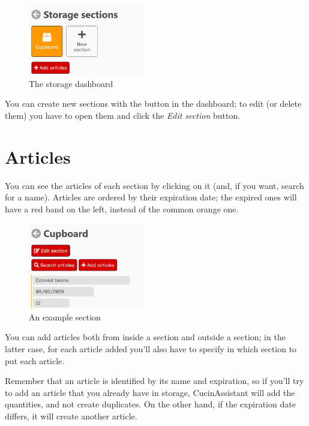 \documentclass[12pt, a4paper]{report}
\begin{document}
    \begin{figure}[H]
        \centering
        \includegraphics[width=0.45\textwidth]{assets/en/sections.png}
        \caption{The storage dashboard}
    \end{figure}

    You can create new sections with the button in the dashboard; to edit (or delete them) you have to open them and click the 
    \emph{Edit section} button.

    \section{Articles}

    You can see the articles of each section by clicking on it (and, if you want, search for a name).
    Articles are ordered by their expiration date; the expired ones will have a red band on the left, instead of the common orange one.

    \begin{figure}[H]
        \centering
        \includegraphics[width=0.45\textwidth]{assets/en/articles.png}
        \caption{An example section}
    \end{figure}

    You can add articles both from inside a section and outside a section; in the latter case, for each article added you'll also have
    to specify in which section to put each article.

    Remember that an article is identified by its name and expiration, so if you'll try to add an article that you already have in storage,
    CucinAssistant will add the quantities, and not create duplicates. On the other hand, if the expiration date differs, it will create another
    article.
\end{document}
